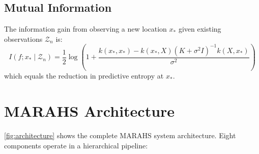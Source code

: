 \documentclass[11pt,twocolumn]{article}
\providecommand{\Cref}[1]{\ref{#1}}
\theoremstyle{definition}
\newcommand{\cZ}{\mathcal{Z}}
\begin{document}
\subsection{Mutual Information}
\label{sec:mutual_info}

The information gain from observing a new location $x_*$ given existing observations $\cZ_n$ is:
\begin{equation}
\label{eq:info_gain}
I(f; x_* \mid \cZ_n) = \frac{1}{2}\log\left(1 + \frac{k(x_*, x_*) - k(x_*, X)(K + \sigma^2 I)^{-1}k(X, x_*)}{\sigma^2}\right)
\end{equation}
which equals the reduction in predictive entropy at $x_*$.

\section{MARAHS Architecture}
\label{sec:methodology}

\Cref{fig:architecture} shows the complete MARAHS system architecture. Eight components operate in a hierarchical pipeline:
\end{document}
